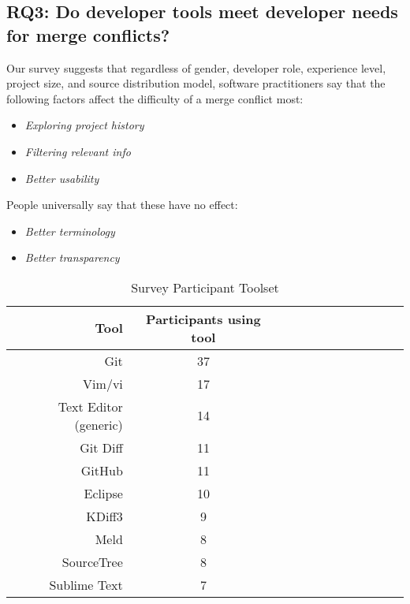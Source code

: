 \subsection{RQ3: Do developer tools meet developer needs for merge conflicts?}\label{RQ3}


Our survey suggests that regardless of gender, developer role, experience level, project size, and source distribution model, software practitioners say that the following factors affect the difficulty of a merge conflict most:

\begin{itemize}
	\item \textit{Exploring project history}\\
	\item \textit{Filtering relevant info}\\
	\item \textit{Better usability}\\
\end{itemize}

People universally say that these have no effect:
\begin{itemize}
	\item \textit{Better terminology}\\
	\item \textit{Better transparency}\\
\end{itemize}

\begin{table}[!]
\renewcommand{\arraystretch}{1.3}
\caption{Survey Participant Toolset}
\label{survey_toolset}
\centering
\begin{tabularx}{0.45\textwidth}{@{}r|*{10}{C}c@{}}
\toprule
Tool & Participants using tool\\
\midrule
Git	& 37\\
Vim/vi & 17\\
Text Editor (generic) & 14\\
Git Diff & 11\\
GitHub & 11\\
Eclipse & 10\\
KDiff3 & 9\\
Meld & 8\\
SourceTree & 8\\
Sublime Text & 7\\
\bottomrule
\end{tabularx}
\end{table}